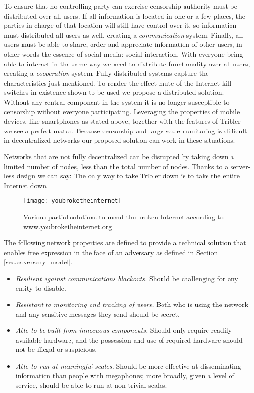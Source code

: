 To ensure that no controlling party can exercise censorship authority must be distributed over all users. %
If all information is located in one or a few places, the parties in charge of that location will still have control over it, so information must distributed all users as well, creating a \emph{communication} system.
Finally, all users must be able to share, order and appreciate information of other users, in other words the essence of social media: social interaction.
With everyone being able to interact in the same way we need to  distribute functionality over all users, creating a \emph{cooperation} system.
Fully distributed systems capture the characteristics just mentioned.
To render the effect mute of the Internet kill switches in existence shown to be used we propose a distributed solution.
Without any central component in the system it is no longer susceptible to censorship without everyone participating.
Leveraging the properties of mobile devices, like smartphones as stated above, together with the features of Tribler we see a perfect match.
Because censorship and large scale monitoring is difficult in decentralized networks our proposed solution can work in these situations.

Networks that are not fully decentralized can be disrupted by taking down a limited number of nodes, less than the total number of nodes.
Thanks to a server-less design we can say:
The only way to take Tribler down is to take the entire Internet down.

\begin{figure}[ht]
	\centering
	\texttt{[image: youbroketheinternet]}
	\caption{Various partial solutions to mend the broken Internet according to www.youbroketheinternet.org}
	\label{fig:youbroketheinternet}
\end{figure}

The following network properties are defined \cite{hasan2013dissent} to provide a technical solution that enables free expression in the face of an adversary as defined in Section \ref{sec:adversary_model}:
\begin{itemize}
	\item \emph{Resilient against communications blackouts.}
	Should be challenging for any entity to disable.
	\item \emph{Resistant to monitoring and tracking of users.}
	Both who is using the network and any sensitive messages they send should be secret.
	\item \emph{Able to be built from innocuous components.}
	Should only require readily available hardware, and the possession and use of required hardware should not be illegal or suspicious.
	\item \emph{Able to run at meaningful scales.}
	Should be more effective at disseminating information than people with megaphones; more broadly, given a level of service, should be able to run at non-trivial scales.
\end{itemize}

